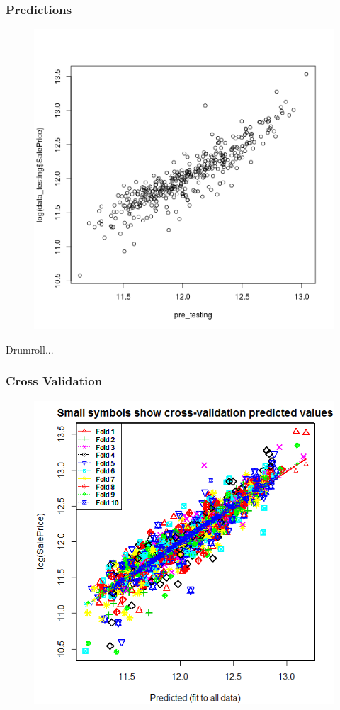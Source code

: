 \documentclass{beamer}
\begin{document}
\begin{frame}
\frametitle{Predictions}
\begin{figure}
\includegraphics[width=0.75\linewidth,keepaspectratio=true]{img/residTesting.png}
\end{figure}
\end{frame}

\begin{frame}
\Huge{\centerline{Drumroll...}}
\end{frame}

\begin{frame}
\frametitle{Cross Validation}
\begin{figure}
\includegraphics[width=0.75\linewidth,keepaspectratio=true]{img/crossValidation.png}
\end{figure}
\end{frame}
\end{document}
